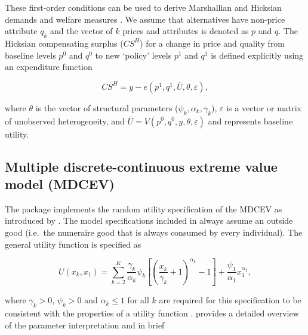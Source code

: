 These first-order conditions can be used to derive Marshallian and
Hicksian demands and welfare measures \citep{vonhaefenkuhn-tucker2005}.
We assume that alternatives have non-price attribute \(q_{k}\) and the
vector of \(k\) prices and attributes is denoted as \(p\) and \(q\). The
Hicksian compensating surplus (\(CS^H\)) for a change in price and
quality from baseline levels \(p^0\) and \(q^0\) to new `policy' levels
\(p^1\) and \(q^1\) is defined explicitly using an expenditure function

\begin{equation}
\label{eq:welfare}
CS^H = y - e(p^1, q^1, \bar{U}, \theta, \varepsilon),
\end{equation}

\noindent where \(\theta\) is the vector of structural parameters
(\(\psi_k, \alpha_k, \gamma_k\)), \(\varepsilon\) is a vector or matrix
of unobserved heterogeneity, and
\(\bar{U} = V(p^0, q^0, y, \theta, \varepsilon)\) and represents
baseline utility.

\hypertarget{multiple-discrete-continuous-extreme-value-model-mdcev}{%
\subsection{Multiple discrete-continuous extreme value model
(MDCEV)}\label{multiple-discrete-continuous-extreme-value-model-mdcev}}

The  package implements the random utility specification of
the MDCEV as introduced by \citet{bhatmultiple2008}. The model
specifications included in  always assume an outside good
(i.e.~the numeraire good that is always consumed by every individual).
The general utility function is specified as

\begin{equation}
U(x_k, x_1) = \sum_{k=2}^{K} \frac{\gamma_k}{\alpha_k}\psi_k \left[ \left( \frac{x_k}{\gamma_k} + 1 \right)^{\alpha_k} - 1 \right] + \frac{\psi_1}{\alpha_1}x_1^{\alpha_1} \label{utilkt},
\end{equation}

\noindent where \(\gamma_k > 0\), \(\psi_k > 0\) and \(\alpha_k \leq 1\)
for all \(k\) are required for this specification to be consistent with
the properties of a utility function \citep{bhatmultiple2008}.
\citet{bhatmultiple2008} provides a detailed overview of the parameter
interpretation and in brief

